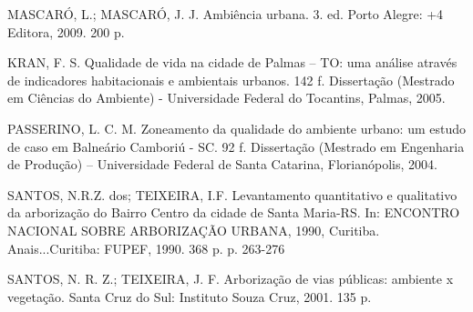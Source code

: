 \documentclass[article,12pt,onesidea,4paper,english,brazil]{abntex2}
\begin{document}
\noindent  MASCARÓ, L.; MASCARÓ, J. J. Ambiência urbana. 3. ed. Porto Alegre: +4 Editora, 2009. 200 p.

\noindent KRAN, F. S. Qualidade de vida na cidade de Palmas – TO: uma análise através de indicadores habitacionais e ambientais urbanos. 142 f. Dissertação (Mestrado em Ciências do Ambiente) - Universidade Federal do Tocantins, Palmas, 2005.

\noindent  PASSERINO, L. C. M. Zoneamento da qualidade do ambiente urbano: um estudo de caso em Balneário Camboriú - SC. 92 f. Dissertação (Mestrado em Engenharia de Produção) – Universidade Federal de Santa Catarina, Florianópolis, 2004.

\noindent  SANTOS, N.R.Z. dos; TEIXEIRA, I.F. Levantamento quantitativo e qualitativo da arborização do Bairro Centro da cidade de Santa Maria-RS. In: ENCONTRO NACIONAL SOBRE ARBORIZAÇÃO URBANA, 1990, Curitiba. Anais...Curitiba: FUPEF, 1990. 368 p. p. 263-276

\noindent SANTOS, N. R. Z.; TEIXEIRA, J. F. Arborização de vias públicas: ambiente x vegetação.
Santa Cruz do Sul: Instituto Souza Cruz, 2001. 135 p.

	
\end{document}

